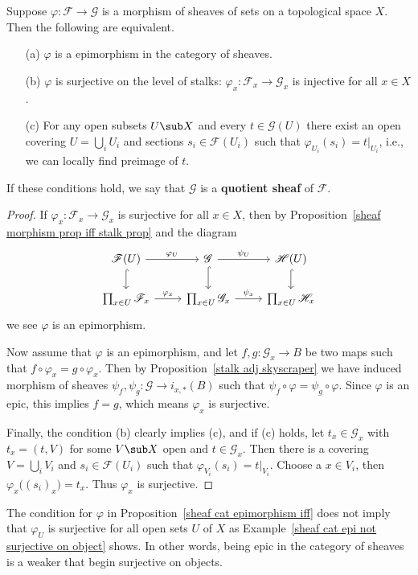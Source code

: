 \begin{proposition}\label{sheaf cat epimorphism iff}
Suppose $\varphi:\mathscr{F}\to\mathscr{G}$ is a morphism of sheaves of sets on a topological space $X$. Then the following are equivalent.
\begin{itemize}
\item[(a)] $\varphi$ is a epimorphism in the category of sheaves.
\item[(b)] $\varphi$ is surjective on the level of stalks: $\varphi_x:\mathscr{F}_x\to\mathscr{G}_x$ is injective for all $x\in X$.
\item[(c)] For any open subsets $U\sub X$ and every $t\in\mathscr{G}(U)$ there exist an open covering $U=\bigcup_iU_i$ and sections $s_i\in\mathscr{F}(U_i)$ such that $\varphi_{U_i}(s_i)=t|_{U_i}$, i.e., we can locally find preimage of $t$.
\end{itemize}
If these conditions hold, we say that $\mathscr{G}$ is a \textbf{quotient sheaf} of $\mathscr{F}$.
\end{proposition}
\begin{proof}
If $\varphi_x:\mathscr{F}_x\to\mathscr{G}_x$ is surjective for all $x\in X$, then by Proposition~\ref{sheaf morphism prop iff stalk prop} and the diagram
\[\begin{tikzcd}
\mathscr{F}(U)\ar[r,"\varphi_U"]\ar[d,hook]&\mathscr{G}\ar[r,"\psi_U"]\ar[d,hook]&\mathscr{H}(U)\ar[d,hook]\\
\prod_{x\in U}\mathscr{F}_x\ar[r,"\varphi_x"]&\prod_{x\in U}\mathscr{G}_x\ar[r,"\psi_x"]&\prod_{x\in U}\mathscr{H}_x
\end{tikzcd}\]
we see $\varphi$ is an epimorphism.\par
Now assume that $\varphi$ is an epimorphism, and let $f,g:\mathscr{G}_x\to B$ be two maps such that $f\circ\varphi_x=g\circ\varphi_x$. Then by Proposition~\ref{stalk adj skyscraper} we have induced morphism of sheaves $\psi_f,\psi_g:\mathscr{G}\to i_{x,*}(B)$ such that $\psi_f\circ\varphi=\psi_g\circ\varphi$. Since $\varphi$ is an epic, this implies $f=g$, which means $\varphi_x$ is surjective.\par
Finally, the condition (b) clearly implies (c), and if (c) holds, let $t_x\in\mathscr{G}_x$ with $t_x=(t,V)$ for some $V\sub X$ open and $t\in\mathscr{G}_x$. Then there is a covering $V=\bigcup_iV_i$ and $s_i\in\mathscr{F}(U_i)$ such that $\varphi_{V_i}(s_i)=t|_{V_i}$. Choose a $x\in V_i$, then $\varphi_x\big((s_i)_x\big)=t_x$. Thus $\varphi_x$ is surjective.
\end{proof}
\begin{remark}
The condition for $\varphi$ in Proposition~\ref{sheaf cat epimorphism iff} does not imply that $\varphi_U$ is surjective for all open sets $U$ of $X$ as Example~\ref{sheaf cat epi not surjective on object} shows. In other words, being epic in the category of sheaves is a weaker that begin surjective on objects.
\end{remark}
